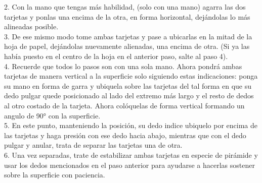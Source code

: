 \documentclass{article}
\begin{document}
2. Con la mano que tengas más habilidad, (solo con una mano) agarra las dos tarjetas y ponlas una encima de la otra, en forma horizontal, dejándolas lo más alineadas posible.\\

3.  De ese mismo modo tome ambas tarjetas y pase a ubicarlas en la mitad de la hoja de papel, dejándolas nuevamente alienadas, una encima de otra. (Si ya las había puesto en el centro de la hoja en el anterior paso, salte al paso 4).\\

4.  Recuerde que todos lo pasos son con una sola mano. Ahora pondrá ambas tarjetas de manera vertical a la superficie solo siguiendo estas indicaciones: ponga su mano en forma de garra y ubiquela sobre las tarjetas del tal forma en que su dedo pulgar quede posicionado al lado del extremo más largo y el resto de dedos al otro costado de la tarjeta. Ahora colóquelas de forma vertical formando un angulo de 90° con la superficie.\\

5. En este punto, manteniendo la posición, su dedo indice ubiquelo por encima de las tarjetas y haga presión con ese dedo hacia abajo, mientras que con el dedo pulgar y anular, trata de separar las tarjetas una de otra.\\

6. Una vez separadas, trate de estabilizar ambas tarjetas en especie de pirámide y usar los dedos mencionados en el paso anterior para ayudarse a hacerlas sostener sobre la superficie con paciencia.



\end{document}
